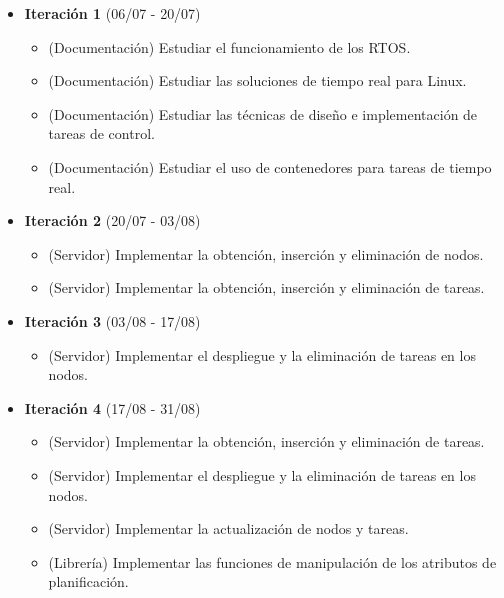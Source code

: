\begin{itemize}
      \item \textbf{Iteración 1} (06/07 - 20/07)
            \begin{itemize}
                  \item (Documentación) Estudiar el funcionamiento de los RTOS.
                  \item (Documentación) Estudiar las soluciones de tiempo real
                        para Linux.
                  \item (Documentación) Estudiar las técnicas de diseño e
                        implementación de tareas de control.
                  \item (Documentación) Estudiar el uso de contenedores para
                        tareas de tiempo real.
            \end{itemize}
      \item \textbf{Iteración 2} (20/07 - 03/08)
            \begin{itemize}
                  \item (Servidor) Implementar la obtención, inserción y
                        eliminación de nodos.
                  \item (Servidor) Implementar la obtención, inserción y
                        eliminación de tareas.
            \end{itemize}
      \item \textbf{Iteración 3} (03/08 - 17/08)
            \begin{itemize}
                  \item (Servidor) Implementar el despliegue y la eliminación de
                        tareas en los nodos.
            \end{itemize}
      \item \textbf{Iteración 4} (17/08 - 31/08)
            \begin{itemize}
                  \item (Servidor) Implementar la obtención, inserción y
                        eliminación de tareas.
                  \item (Servidor) Implementar el despliegue y la eliminación de
                        tareas en los nodos.
                  \item (Servidor) Implementar la actualización de nodos y
                        tareas.
                  \item (Librería) Implementar las funciones de manipulación de
                        los atributos de planificación.

\end{itemize}
\end{itemize}
